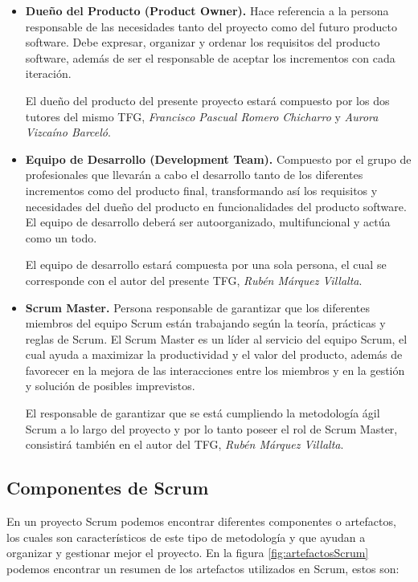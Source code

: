 \begin{itemize}
	\item \textbf{Dueño del Producto (Product Owner).} Hace referencia a la persona responsable de las necesidades tanto del proyecto como del futuro producto software. Debe expresar, organizar y ordenar los requisitos del producto software, además de ser el responsable de aceptar los incrementos con cada iteración.
	
	El dueño del producto del presente proyecto estará compuesto por los dos tutores del mismo TFG, \emph{Francisco Pascual Romero Chicharro} y \emph{Aurora Vizcaíno Barceló}.
	\item \textbf{Equipo de Desarrollo (Development Team).} Compuesto por el grupo de profesionales que llevarán a cabo el desarrollo tanto de los diferentes incrementos como del producto final, transformando así los requisitos y necesidades del dueño del producto en funcionalidades del producto software. El equipo de desarrollo deberá ser autoorganizado, multifuncional y actúa como un todo.
	
	El equipo de desarrollo estará compuesta por una sola persona, el cual se corresponde con el autor del presente TFG, \emph{Rubén Márquez Villalta}.
	\item \textbf{Scrum Master.} Persona responsable de garantizar que los diferentes miembros del equipo Scrum están trabajando según la teoría, prácticas y reglas de Scrum. El Scrum Master es un líder al servicio del equipo Scrum, el cual ayuda a maximizar la productividad y el valor del producto, además de favorecer en la mejora de las interacciones entre los miembros y en la gestión y solución de posibles imprevistos.
	
	El responsable de garantizar que se está cumpliendo la metodología ágil Scrum a lo largo del proyecto y por lo tanto poseer el rol de Scrum Master, consistirá también en el autor del TFG, \emph{Rubén Márquez Villalta}.
\end{itemize}

\subsection{Componentes de Scrum}
\label{sec:ComponentesScrum}

En un proyecto Scrum podemos encontrar diferentes componentes o artefactos, los cuales son característicos de este tipo de metodología y que ayudan a organizar y gestionar mejor el proyecto. En la figura \ref{fig:artefactosScrum} podemos encontrar un resumen de los artefactos utilizados en Scrum, estos son:


